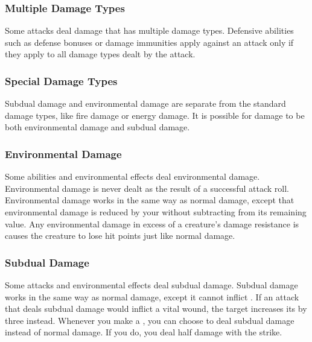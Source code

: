         \subsubsection{Multiple Damage Types}\label{Multiple Damage Types}
            Some attacks deal damage that has multiple damage types.
            Defensive abilities such as defense bonuses or damage immunities apply against an attack only if they apply to all damage types dealt by the attack.

    \subsubsection{Special Damage Types}\label{Special Damage Types}

        Subdual damage and environmental damage are separate from the standard damage types, like fire damage or energy damage.
        It is possible for damage to be both environmental damage and subdual damage.

        \subsubsection{Environmental Damage}\label{Environmental Damage}
            Some abilities and environmental effects deal environmental damage.
            Environmental damage is never dealt as the result of a successful attack roll.
            Environmental damage works in the same way as normal damage, except that environmental damage is reduced by your  without subtracting from its remaining value.
            Any environmental damage in excess of a creature's damage resistance is causes the creature to lose hit points just like normal damage.

        \subsubsection{Subdual Damage}\label{Subdual Damage}
            Some attacks and environmental effects deal subdual damage.
            Subdual damage works in the same way as normal damage, except it cannot inflict .
            If an attack that deals subdual damage would inflict a vital wound, the target increases its  by three instead.
            Whenever you make a , you can choose to deal subdual damage instead of normal damage.
            If you do, you deal half damage with the strike.

